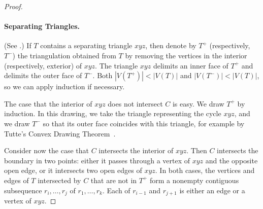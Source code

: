 \begin{proof}
	
	
\paragraph{Separating Triangles.}
(See .)
	If $T$ contains a separating triangle $xyz$, then denote by
        $T^+$ (respectively, $T^-$) the triangulation obtained from
        $T$ by removing the vertices in the interior
        (respectively, exterior) of $xyz$. The triangle $xyz$ delimits an
        inner face of $T^+$ and delimits the outer face of $T^-$.
Both $|V(T^+)|<|V(T)|$
and $|V(T^-)|<|V(T)|$, so we can apply induction if necessary.
        
The case that the interior of $xyz$ does not intersect $C$ is easy.
We draw $T^+$ by induction.  In this drawing, %
we take the triangle representing the cycle $xyz$, and we draw $T^-$
so that its outer face coincides with this triangle, for example by
Tutte's Convex Drawing Theorem~\cite{tutte:how}.

Consider now the case that $C$ intersects the interior of $xyz$. Then
$C$ intersects the boundary in two points: either it passes through a
vertex of $xyz$ and the opposite open edge, or it intersects two open
edges of $xyz$. %
In both cases, the vertices and edges of $T$ intersected by $C$ that
are not in $T^+$ form a nonempty contiguous subsequence
$r_i,\ldots,r_j$ of $r_1,\ldots,r_k$. Each of $r_{i-1}$ and $r_{j+1}$
is either an edge or a vertex of $xyz$.
	

\end{proof}
